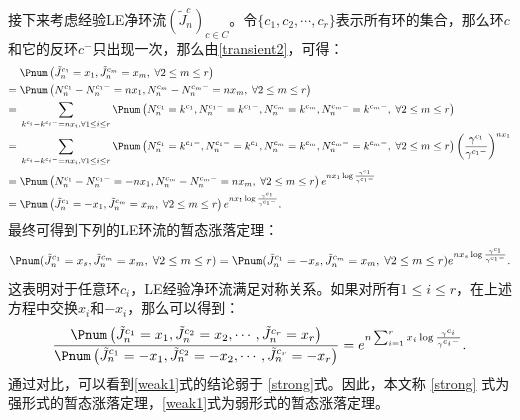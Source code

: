 接下来考虑经验LE净环流$(\tilde{J}^{c}_n)_{c\in C}$。令$\{c_1,c_2,\cdots,c_r\}$表示所有环的集合，那么环$c$和它的反环$c^-$只出现一次，那么由\ref{transient2}，可得：
\begin{align*}
    &\; \Pnum\left(\tilde{J}^{c_1}_n=x_1,\tilde{J}^{c_m}_n=x_m,\;\forall 2\le m \le r\right) \\
    =&\; \Pnum\left(N^{c_1}_n-N^{c_1-}_n=n x_1,N^{c_m}_n-N^{c_m-}_n=n x_m,\;\forall 2\le m \le r\right) \\
    =&\; \sum_{k^{c_i}-k^{c_i-}=n x_i,\forall 1\le i \le r} \Pnum\left(N^{c_1}_n=k^{c_1},N^{c_1-}_n=k^{c_1-},  N^{c_m}_n=k^{c_m},N^{c_m-}_n=k^{c_m-},\;\forall 2\le m \le r\right) \\
    =&\; \sum_{k^{c_i}-k^{c_i-}=n x_i,\forall 1\le i \le r} \Pnum\left(N^{c_1}_n=k^{c_1-},N^{c_1-}_n=k^{c_1}, N^{c_m}_n=k^{c_m},N^{c_m-}_n=k^{c_m-},\;\forall 2\le m \le r\right)\left(\frac{\gamma^{c_1}}{\gamma^{c_1-}}\right)^{n x_1}  \\
    =&\; \Pnum\left(N^{c_1}_n-N^{c_1-}_n=-n x_1, N^{c_m}_n-N^{c_m-}_n=n x_m,\;\forall 2\le m \le r\right) e^{n x_1 \log \frac{\gamma^{c_1}}{\gamma^{c_1-}}} \\
    =&\; \Pnum\left(\tilde{J}^{c_1}_n=-x_1,\tilde{J}^{c_m}_n=x_m,\;\forall 2\le m \le r\right) e^{n x_1 \log \frac{\gamma^{c_1}}{\gamma^{c_1-}}} .
\end{align*}
最终可得到下列的LE环流的暂态涨落定理：
\begin{equation}\label{strong}
    \Pnum(\tilde{J}^{c_1}_n=x_s,\tilde{J}^{c_m}_n=x_m,\;\forall 2\le m \le r) \\
    = \Pnum(\tilde{J}^{c_1}_n=-x_s,\tilde{J}^{c_m}_n=x_m,\;\forall 2\le m \le r)e^{nx_s\log\frac{\gamma^{c_1}}{\gamma^{c_1-}}}.
\end{equation}
这表明对于任意环$c_i$，LE经验净环流满足对称关系。如果对所有$1\le i \le r$，在上述方程中交换$x_i$和$-x_i$，那么可以得到：
\begin{equation}\label{weak1}
    \begin{split}
    \frac{\Pnum\left(\tilde{J}^{c_1}_n=x_1,\tilde{J}^{c_2}_n=x_2,\cdots,\tilde{J}^{c_{r}}_n=x_{r}\right)}
    {\Pnum\left(\tilde{J}^{c_1}_n=-x_1,\tilde{J}^{c_2}_n=-x_2,\cdots,\tilde{J}^{c_{r}}_n=-x_{r}\right)}
    =e^{n\sum_{i=1}^{r}x_i\log\frac{\gamma^{c_i}}{\gamma^{c_i-}}}.
    \end{split}
\end{equation}
通过对比，可以看到\eqref{weak1}式的结论弱于 \eqref{strong}式。因此，本文称 \eqref{strong} 式为强形式的暂态涨落定理，\eqref{weak1}式为弱形式的暂态涨落定理。

